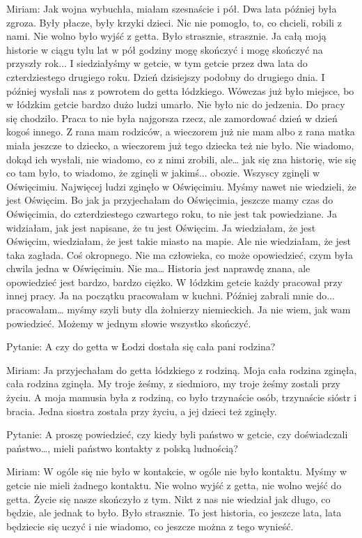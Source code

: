 Miriam: Jak wojna wybuchła, miałam szesnaście i pół. Dwa lata później była zgroza. Były płacze, były krzyki dzieci. Nic nie pomogło, to, co chcieli, robili z nami. Nie wolno było wyjść z getta. Było strasznie, strasznie. Ja całą moją historie w ciągu tylu lat w pół godziny mogę skończyć i mogę skończyć na przyszły rok... I siedziałyśmy w getcie, w tym getcie przez dwa lata do czterdziestego drugiego roku. Dzień dzisiejszy podobny do drugiego dnia. I później wysłali nas z powrotem do getta łódzkiego. Wówczas już było miejsce, bo w łódzkim getcie  bardzo dużo ludzi umarło. Nie było nic do jedzenia. Do pracy się chodziło. Praca to nie była najgorsza rzecz, ale zamordować dzień w dzień kogoś innego. Z rana mam rodziców, a wieczorem już nie mam albo z rana matka miała jeszcze to dziecko, a wieczorem już tego dziecka też nie było. Nie wiadomo, dokąd ich wysłali, nie wiadomo, co z nimi zrobili, ale… jak się zna historię, wie się co tam było, to wiadomo, że zginęli w jakimś... obozie. Wszyscy zginęli w Oświęcimiu. Najwięcej ludzi zginęło w Oświęcimiu. Myśmy nawet nie wiedzieli, że jest Oświęcim. Bo jak ja przyjechałam do Oświęcimia, jeszcze mamy czas do Oświęcimia, do czterdziestego czwartego roku, to nie jest tak powiedziane. Ja widziałam, jak jest napisane, że tu jest Oświęcim. Ja wiedziałam, że jest Oświęcim, wiedziałam, że jest takie miasto na mapie. Ale nie wiedziałam, że jest taka zagłada. Coś okropnego. Nie ma człowieka, co może opowiedzieć, czym była chwila jedna w Oświęcimiu. Nie ma… Historia jest naprawdę znana, ale opowiedzieć jest bardzo, bardzo ciężko. W łódzkim getcie każdy pracował przy innej pracy. Ja na początku pracowałam w kuchni. Później zabrali mnie do... pracowałam… myśmy szyli buty dla żołnierzy niemieckich. Ja nie wiem, jak wam powiedzieć. Możemy w jednym słowie wszystko skończyć. 

 

Pytanie: A czy do getta w Łodzi dostała się cała pani rodzina? 

Miriam: Ja przyjechałam do getta łódzkiego z rodziną. Moja cała rodzina zginęła, cała rodzina zginęła. My troje żeśmy, z siedmioro, my troje żeśmy zostali przy życiu. A moja mamusia była z rodziną, co było trzynaście osób, trzynaście sióstr i bracia. Jedna siostra została przy życiu, a jej dzieci też zginęły. 

 

Pytanie: A proszę powiedzieć, czy kiedy byli państwo w getcie, czy doświadczali państwo…, mieli państwo kontakty z polską ludnością? 

Miriam: W ogóle się nie było w kontakcie, w ogóle nie było kontaktu. Myśmy w getcie nie mieli żadnego kontaktu. Nie wolno wyjść z getta, nie wolno wejść do getta. Życie się nasze skończyło z tym. Nikt z nas nie wiedział jak długo, co będzie, ale jednak to było. Było strasznie. To jest historia, co jeszcze lata, lata będziecie się uczyć i nie wiadomo, co jeszcze można z tego wynieść. 

